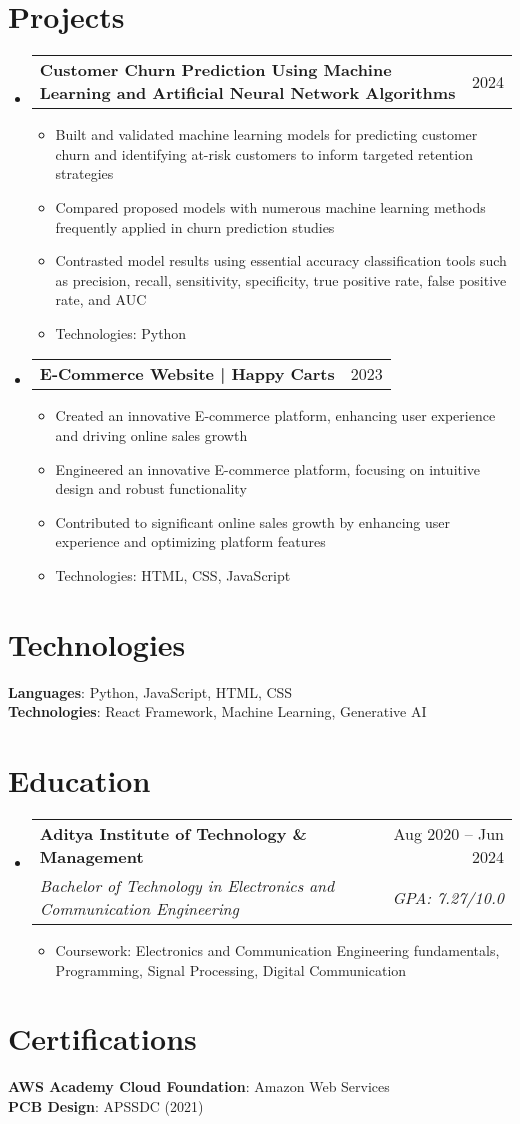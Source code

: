 \documentclass[letterpaper,9pt]{article}
\makeatletter
\newcommand{\resumeItem}[1]{
  \item\small{
    {#1 \vspace{-2pt}}
  }
}
\newcommand{\resumeSubheading}[4]{
  \vspace{-2pt}\item
    \begin{tabular*}{0.97\textwidth}[t]{l@{\extracolsep{\fill}}r}
      \textbf{#1} & #2 \\
      \textit{\small#3} & \textit{\small #4} \\
    \end{tabular*}\vspace{-7pt}
}
\newcommand{\resumeProjectHeading}[2]{
    \item
    \begin{tabular*}{0.97\textwidth}{l@{\extracolsep{\fill}}r}
      \small#1 & #2 \\
    \end{tabular*}\vspace{-7pt}
}
\newcommand{\resumeSubHeadingListStart}{\begin{itemize}[leftmargin=0.15in, label={}]}
\newcommand{\resumeSubHeadingListEnd}{\end{itemize}}
\newcommand{\resumeItemListStart}{\begin{itemize}}
\newcommand{\resumeItemListEnd}{\end{itemize}\vspace{-5pt}}
\makeatother
\begin{document}
\section{Projects}
    \resumeSubHeadingListStart
      \resumeProjectHeading
          {\textbf{Customer Churn Prediction Using Machine Learning and Artificial Neural Network Algorithms}}{2024}
          \resumeItemListStart
            \resumeItem{Built and validated machine learning models for predicting customer churn and identifying at-risk customers to inform targeted retention strategies}
            \resumeItem{Compared proposed models with numerous machine learning methods frequently applied in churn prediction studies}
            \resumeItem{Contrasted model results using essential accuracy classification tools such as precision, recall, sensitivity, specificity, true positive rate, false positive rate, and AUC}
            \resumeItem{Technologies: Python}
          \resumeItemListEnd
          
      \resumeProjectHeading
          {\textbf{E-Commerce Website | Happy Carts}}{2023}
          \resumeItemListStart
            \resumeItem{Created an innovative E-commerce platform, enhancing user experience and driving online sales growth}
            \resumeItem{Engineered an innovative E-commerce platform, focusing on intuitive design and robust functionality}
            \resumeItem{Contributed to significant online sales growth by enhancing user experience and optimizing platform features}
            \resumeItem{Technologies: HTML, CSS, JavaScript}
          \resumeItemListEnd
    \resumeSubHeadingListEnd

\section{Technologies}
 \begin{itemize}[leftmargin=0.15in, label={}]
    \small{\item{
     \textbf{Languages}{: Python, JavaScript, HTML, CSS} \\
     \textbf{Technologies}{: React Framework, Machine Learning, Generative AI} \\
    }}
 \end{itemize}

\section{Education}
  \resumeSubHeadingListStart
    \resumeSubheading
      {Aditya Institute of Technology \& Management}{Aug 2020 -- Jun 2024}
      {Bachelor of Technology in Electronics and Communication Engineering}{GPA: 7.27/10.0}
      \resumeItemListStart
        \resumeItem{Coursework: Electronics and Communication Engineering fundamentals, Programming, Signal Processing, Digital Communication}
      \resumeItemListEnd
  \resumeSubHeadingListEnd

\section{Certifications}
 \begin{itemize}[leftmargin=0.15in, label={}]
    \small{\item{
     \textbf{AWS Academy Cloud Foundation}{: Amazon Web Services} \\
     \textbf{PCB Design}{: APSSDC (2021)} \\
    }}
 \end{itemize}
\end{document}
